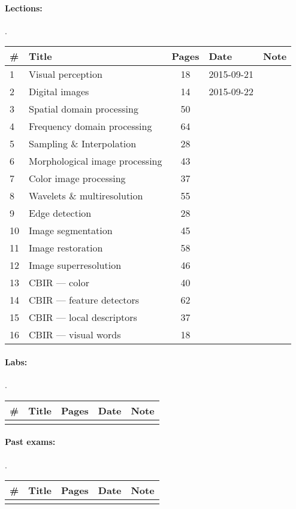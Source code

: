 \documentclass[a4paper,12pt]{article} %
\begin{document}
\paragraph{Lections:} .\\
\begin{tabularx}{\textwidth}{|l|X|c|l|c|}
	\hline
	\# & Title & Pages & Date & Note \\
	\hline
	1 & Visual perception & 18 & 2015-09-21 &  \\
	\hline
	2 & Digital images & 14 & 2015-09-22 &  \\
	\hline
	3 & Spatial domain processing & 50 &  &  \\
	\hline
	4 & Frequency domain processing & 64 &  &  \\
	\hline
	5 & Sampling \& Interpolation & 28 &  &  \\
	\hline
	6 & Morphological image processing & 43 &  &  \\
	\hline
	7 & Color image processing & 37 &  &  \\
	\hline
	8 & Wavelets \& multiresolution & 55 &  &  \\
	\hline
	9 & Edge detection & 28 &  &  \\
	\hline
	10 & Image segmentation & 45 &  &  \\
	\hline
	11 & Image restoration & 58 &  &  \\
	\hline
	12 & Image superresolution & 46 &  &  \\
	\hline
	13 & CBIR --- color & 40 &  &  \\
	\hline
	14 & CBIR --- feature detectors & 62 &  &  \\
	\hline
	15 & CBIR --- local descriptors & 37 &  &  \\
	\hline
	16 & CBIR --- visual words & 18 &  &  \\
	\hline
\end{tabularx}

\paragraph{Labs:}.\\
\begin{tabularx}{\textwidth}{|l|X|c|l|c|}
	\hline
	\# & Title & Pages & Date & Note \\
	\hline
	&  &  &  &  \\
	\hline
\end{tabularx}

\paragraph{Past exams:}.\\
\begin{tabularx}{\textwidth}{|l|X|c|l|c|}
	\hline
	\# & Title & Pages & Date & Note \\
	\hline
	&  &  &  &  \\
	\hline
\end{tabularx}
\end{document}
